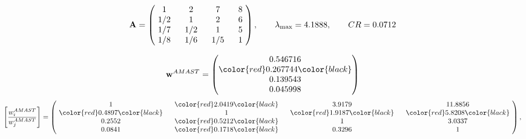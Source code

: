 \begin{example}
\begin{equation*}
\mathbf{A} =
\begin{pmatrix}
$\,\,$ 1 $\,\,$ & $\,\,$2$\,\,$ & $\,\,$7$\,\,$ & $\,\,$8 $\,\,$ \\
$\,\,$ 1/2$\,\,$ & $\,\,$ 1 $\,\,$ & $\,\,$2$\,\,$ & $\,\,$6 $\,\,$ \\
$\,\,$ 1/7$\,\,$ & $\,\,$ 1/2$\,\,$ & $\,\,$ 1 $\,\,$ & $\,\,$5 $\,\,$ \\
$\,\,$ 1/8$\,\,$ & $\,\,$ 1/6$\,\,$ & $\,\,$ 1/5$\,\,$ & $\,\,$ 1  $\,\,$ \\
\end{pmatrix},
\qquad
\lambda_{\max} =
4.1888,
\qquad
CR = 0.0712
\end{equation*}

\begin{equation*}
\mathbf{w}^{AMAST} =
\begin{pmatrix}
0.546716\\
\color{red} 0.267744\color{black} \\
0.139543\\
0.045998
\end{pmatrix}\end{equation*}
\begin{equation*}
\left[ \frac{{w}^{AMAST}_i}{{w}^{AMAST}_j} \right] =
\begin{pmatrix}
$\,\,$ 1 $\,\,$ & $\,\,$\color{red} 2.0419\color{black} $\,\,$ & $\,\,$3.9179$\,\,$ & $\,\,$11.8856$\,\,$ \\
$\,\,$\color{red} 0.4897\color{black} $\,\,$ & $\,\,$ 1 $\,\,$ & $\,\,$\color{red} 1.9187\color{black} $\,\,$ & $\,\,$\color{red} 5.8208\color{black}   $\,\,$ \\
$\,\,$0.2552$\,\,$ & $\,\,$\color{red} 0.5212\color{black} $\,\,$ & $\,\,$ 1 $\,\,$ & $\,\,$3.0337 $\,\,$ \\
$\,\,$0.0841$\,\,$ & $\,\,$\color{red} 0.1718\color{black} $\,\,$ & $\,\,$0.3296$\,\,$ & $\,\,$ 1  $\,\,$ \\
\end{pmatrix},
\end{equation*}


\end{example}
